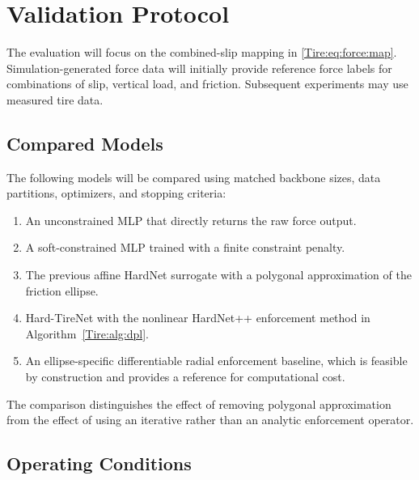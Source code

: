\section{Validation Protocol}
\label{Tire:sec:validation}

The evaluation will focus on the combined-slip mapping in
\eqref{Tire:eq:force:map}. Simulation-generated force data will initially
provide reference force labels for combinations of slip, vertical load, and
friction. Subsequent experiments may use measured tire data.

\subsection{Compared Models}
\label{Tire:sec:compared:models}

The following models will be compared using matched backbone sizes, data
partitions, optimizers, and stopping criteria:
\begin{enumerate}
	\item An unconstrained MLP that directly returns the raw force output.
	\item A soft-constrained MLP trained with a finite constraint penalty.
	\item The previous affine HardNet surrogate with a polygonal approximation of the
	      friction ellipse.
	\item Hard-TireNet with the nonlinear HardNet++ enforcement method in
	      Algorithm~\ref{Tire:alg:dpl}.
	\item An ellipse-specific differentiable radial enforcement baseline, which is
	      feasible by construction and provides a reference for computational cost.
\end{enumerate}
The comparison distinguishes the effect of removing polygonal
approximation from the effect of using an iterative rather than an
analytic enforcement operator.

\subsection{Operating Conditions}
\label{Tire:sec:operating:conditions}

